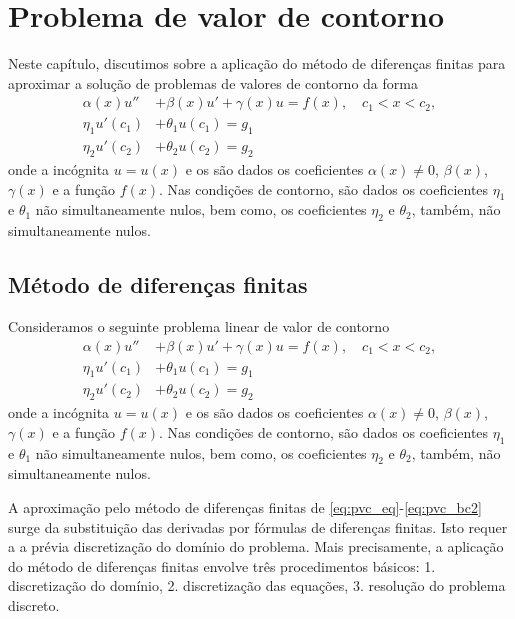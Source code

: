 
\chapter{Problema de valor de contorno}\label{cap_pvc}
\thispagestyle{fancy}

Neste capítulo, discutimos sobre a aplicação do método de diferenças finitas para aproximar a solução de problemas de valores de contorno da forma
\begin{align}
  \alpha(x) u'' &+ \beta(x) u' + \gamma(x) u = f(x),\quad c_1 < x < c_2,\\
  \eta_1 u'(c_1) &+ \theta_1 u(c_1) = g_1\\
  \eta_2 u'(c_2) &+ \theta_2 u(c_2) = g_2
\end{align}
onde a incógnita $u = u(x)$ e os são dados os coeficientes $\alpha(x)\neq 0$, $\beta(x)$, $\gamma(x)$ e a função $f(x)$. Nas condições de contorno, são dados os coeficientes $\eta_1$ e $\theta_1$ não simultaneamente nulos, bem como, os coeficientes $\eta_2$ e $\theta_2$, também, não simultaneamente nulos.

\section{Método de diferenças finitas}\label{cap_pvc_sec_mdf}

Consideramos o seguinte problema linear de valor de contorno
\begin{align}
  \alpha(x) u'' &+ \beta(x) u' + \gamma(x) u = f(x),\quad c_1 < x < c_2, \label{eq:pvc_eq}\\
  \eta_1 u'(c_1) &+ \theta_1 u(c_1) = g_1 \label{eq:pvc_bc1}\\
  \eta_2 u'(c_2) &+ \theta_2 u(c_2) = g_2 \label{eq:pvc_bc2}
\end{align}
onde a incógnita $u = u(x)$ e os são dados os coeficientes $\alpha(x)\neq 0$, $\beta(x)$, $\gamma(x)$ e a função $f(x)$. Nas condições de contorno, são dados os coeficientes $\eta_1$ e $\theta_1$ não simultaneamente nulos, bem como, os coeficientes $\eta_2$ e $\theta_2$, também, não simultaneamente nulos.

A aproximação pelo método de diferenças finitas de \eqref{eq:pvc_eq}-\eqref{eq:pvc_bc2} surge da substituição das derivadas por fórmulas de diferenças finitas. Isto requer a a prévia discretização do domínio do problema. Mais precisamente, a aplicação do método de diferenças finitas envolve três procedimentos básicos: 1. discretização do domínio, 2. discretização das equações, 3. resolução do problema discreto.

